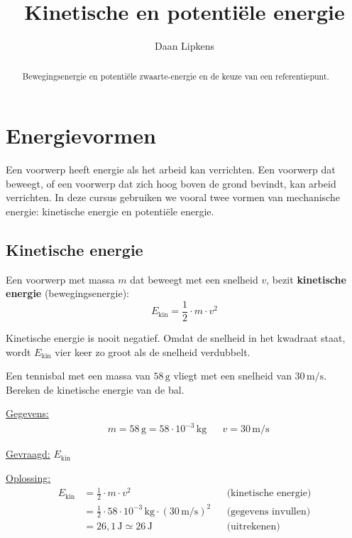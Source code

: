 \documentclass{ximera}
\title{Kinetische en potentiële energie}
\author{Daan Lipkens}
\begin{document}
\begin{abstract}
    Bewegingsenergie en potentiële zwaarte-energie en de keuze van een referentiepunt.
\end{abstract}
\maketitle
\label{app:energievormen}

\section{Energievormen}\label{sec:energievormen}
Een voorwerp heeft energie als het arbeid kan verrichten. Een voorwerp dat beweegt, of een voorwerp dat zich hoog boven de grond bevindt, kan arbeid verrichten. In deze cursus gebruiken we vooral twee vormen van mechanische energie: kinetische energie en potentiële energie.

\subsection{Kinetische energie}
\begin{definition}[title={Kinetische energie}]\nl
    Een voorwerp met massa $m$ dat beweegt met een snelheid $v$, bezit \textbf{kinetische energie} (bewegingsenergie):
    \begin{equation}\label{eq:ekin}
        E_{\text{kin}} = \frac{1}{2} \cdot m \cdot v^{2}
    \end{equation}
\end{definition}

Kinetische energie is nooit negatief. Omdat de snelheid in het kwadraat staat, wordt $E_{\text{kin}}$ vier keer zo groot als de snelheid verdubbelt.

\begin{example}[foldable=true,title={Voorbeeld: kinetische energie van een tennisbal}]\nl
    Een tennisbal met een massa van $58 \, \mathrm{g}$ vliegt met een snelheid van $30 \, \mathrm{m/s}$. Bereken de kinetische energie van de bal.

    \begin{solution}\nl
        \underline{Gegevens:}
        \begin{align*}
            & m = 58 \, \mathrm{g} = 58 \cdot 10^{-3} \, \mathrm{kg} & & v = 30 \, \mathrm{m/s}
        \end{align*}

        \underline{Gevraagd:} $E_{\text{kin}}$

        \underline{Oplossing:}
        \begin{align*}
            E_{\text{kin}} &= \frac{1}{2} \cdot m \cdot v^{2} && \text{(kinetische energie)}\\
            &= \frac{1}{2} \cdot 58 \cdot 10^{-3} \, \mathrm{kg} \cdot (30 \, \mathrm{m/s})^{2} && \text{(gegevens invullen)}\\
            &= 26{,}1 \, \mathrm{J} \simeq \boxed{26 \, \mathrm{J}} && \text{(uitrekenen)}
        \end{align*}
    \end{solution}
\end{example}
\end{document}
